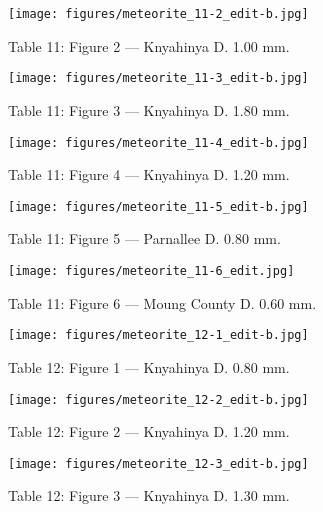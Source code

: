 \documentclass[a4paper, 12pt, oneside]{article}
\begin{document}
\clearpage
\begin{figure}[t]
\texttt{[image: figures/meteorite\_11-2\_edit-b.jpg]}
\caption{Table 11: Figure 2 --- Knyahinya D. 1.00 mm.}
\centering
\end{figure}
\clearpage
\begin{figure}[t]
\texttt{[image: figures/meteorite\_11-3\_edit-b.jpg]}
\caption{Table 11: Figure 3 --- Knyahinya D. 1.80 mm.}
\centering
\end{figure}
\clearpage
\begin{figure}[t]
\texttt{[image: figures/meteorite\_11-4\_edit-b.jpg]}
\caption{Table 11: Figure 4 --- Knyahinya D. 1.20 mm.}
\centering
\end{figure}
\clearpage
\begin{figure}[t]
\texttt{[image: figures/meteorite\_11-5\_edit-b.jpg]}
\caption{Table 11: Figure 5 --- Parnallee D. 0.80 mm.}
\centering
\end{figure}
\clearpage
\begin{figure}[t]
\texttt{[image: figures/meteorite\_11-6\_edit.jpg]}
\caption{Table 11: Figure 6 --- Moung County D. 0.60 mm.}
\centering
\end{figure}
\clearpage
{}
\begin{figure}[t]
\texttt{[image: figures/meteorite\_12-1\_edit-b.jpg]}
\caption{Table 12: Figure 1 --- Knyahinya D. 0.80 mm.}
\centering
\end{figure}
\clearpage
\begin{figure}[t]
\texttt{[image: figures/meteorite\_12-2\_edit-b.jpg]}
\caption{Table 12: Figure 2 --- Knyahinya D. 1.20 mm.}
\centering
\end{figure}
\clearpage
\begin{figure}[t]
\texttt{[image: figures/meteorite\_12-3\_edit-b.jpg]}
\caption{Table 12: Figure 3 --- Knyahinya D. 1.30 mm.}
\centering
\end{figure}
\clearpage
\end{document}
